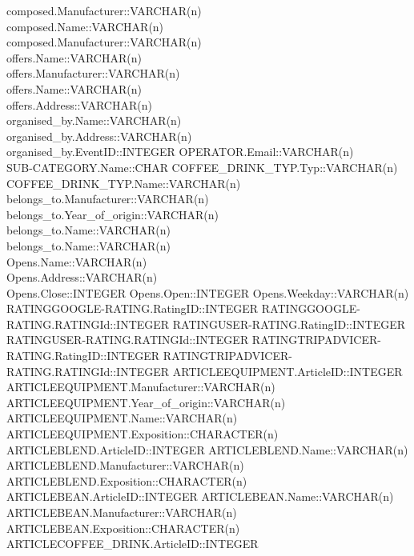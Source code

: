 composed.Manufacturer::VARCHAR(n)\\
composed.Name::VARCHAR(n)\\
composed.Manufacturer::VARCHAR(n)\\
offers.Name::VARCHAR(n)\\
offers.Manufacturer::VARCHAR(n)\\
offers.Name::VARCHAR(n)\\
offers.Address::VARCHAR(n)\\
organised\_by.Name::VARCHAR(n)\\
organised\_by.Address::VARCHAR(n)\\
organised\_by.EventID::INTEGER
OPERATOR.Email::VARCHAR(n)\\
SUB-CATEGORY.Name::CHAR
COFFEE\_DRINK\_TYP.Typ::VARCHAR(n)\\
COFFEE\_DRINK\_TYP.Name::VARCHAR(n)\\
belongs\_to.Manufacturer::VARCHAR(n)\\
belongs\_to.Year\_of\_origin::VARCHAR(n)\\
belongs\_to.Name::VARCHAR(n)\\
belongs\_to.Name::VARCHAR(n)\\
Opens.Name::VARCHAR(n)\\
Opens.Address::VARCHAR(n)\\
Opens.Close::INTEGER
Opens.Open::INTEGER
Opens.Weekday::VARCHAR(n)\\
RATINGGOOGLE-RATING.RatingID::INTEGER
RATINGGOOGLE-RATING.RATINGId::INTEGER
RATINGUSER-RATING.RatingID::INTEGER
RATINGUSER-RATING.RATINGId::INTEGER
RATINGTRIPADVICER-RATING.RatingID::INTEGER
RATINGTRIPADVICER-RATING.RATINGId::INTEGER
ARTICLEEQUIPMENT.ArticleID::INTEGER
ARTICLEEQUIPMENT.Manufacturer::VARCHAR(n)\\
ARTICLEEQUIPMENT.Year\_of\_origin::VARCHAR(n)\\
ARTICLEEQUIPMENT.Name::VARCHAR(n)\\
ARTICLEEQUIPMENT.Exposition::CHARACTER(n)\\
ARTICLEBLEND.ArticleID::INTEGER
ARTICLEBLEND.Name::VARCHAR(n)\\
ARTICLEBLEND.Manufacturer::VARCHAR(n)\\
ARTICLEBLEND.Exposition::CHARACTER(n)\\
ARTICLEBEAN.ArticleID::INTEGER
ARTICLEBEAN.Name::VARCHAR(n)\\
ARTICLEBEAN.Manufacturer::VARCHAR(n)\\
ARTICLEBEAN.Exposition::CHARACTER(n)\\
ARTICLECOFFEE\_DRINK.ArticleID::INTEGER
